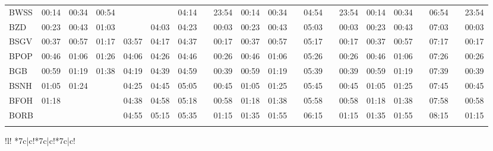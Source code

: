 \begin{center}
\ifpa
\ifpaula
\begin{tabular}{!{\color{magenta}\vrule width 3pt}l!{\color{magenta}\vrule width 3pt}*{7}{c|}c!{\color{magenta}\vrule width 3pt}*{2}{*{5}{c|}c!{\color{magenta}\vrule width 3pt}}}
\hline
{}
 &  &  \\
\hline
BWSS     & 
00:14 & 00:34 & 00:54 &       &       & 04:14 &  & 23:54 & 
00:14 & 00:34 &  & 04:54 &  & 23:54 & 
00:14 & 00:34 &  & 06:54 &  & 23:54 \\
BZD      & 
00:23 & 00:43 & 01:03 &       & 04:03 & 04:23 & \mgt{}   & 00:03 & 
00:23 & 00:43 & \mgt{}   & 05:03 & \mgt{}   & 00:03 &
00:23 & 00:43 & \mgt{}   & 07:03 & \mgt{}   & 00:03 \\
BSGV     & 
00:37 & 00:57 & 01:17 & 03:57 & 04:17 & 04:37 & \mgt{}   & 00:17 & 
00:37 & 00:57 & \mgt{}   & 05:17 & \mgt{}   & 00:17 &
00:37 & 00:57 & \mgt{}   & 07:17 & \mgt{}   & 00:17 \\
BPOP     & 
00:46 & 01:06 & 01:26 & 04:06 & 04:26 & 04:46 & \mgt{}   & 00:26 & 
00:46 & 01:06 & \mgt{}   & 05:26 & \mgt{}   & 00:26 &
00:46 & 01:06 & \mgt{}   & 07:26 & \mgt{}   & 00:26 \\
BGB      & 
00:59 & 01:19 & 01:38 & 04:19 & 04:39 & 04:59 & \mgt{}   & 00:39 & 
00:59 & 01:19 & \mgt{}   & 05:39 & \mgt{}   & 00:39 &
00:59 & 01:19 & \mgt{}   & 07:39 & \mgt{}   & 00:39 \\
BSNH     & 
01:05 & 01:24 &       & 04:25 & 04:45 & 05:05 & \mgt{}   & 00:45 & 
01:05 & 01:25 & \mgt{}   & 05:45 & \mgt{}   & 00:45 &
01:05 & 01:25 & \mgt{}   & 07:45 & \mgt{}   & 00:45 \\
BFOH     & 
01:18 &       &       & 04:38 & 04:58 & 05:18 & \mgt{}   & 00:58 & 
01:18 & 01:38 & \mgt{}   & 05:58 & \mgt{}   & 00:58 &
01:18 & 01:38 & \mgt{}   & 07:58 & \mgt{}   & 00:58 \\
BORB     & 
      &       &       & 04:55 & 05:15 & 05:35 & \mgt{}   & 01:15 & 
01:35 & 01:55 & \mgt{}   & 06:15 & \mgt{}   & 01:15 &
01:35 & 01:55 & \mgt{}   & 08:15 & \mgt{}   & 01:15 \\
\myhline
\end{tabular}
\begin{tabular}{!{\color{magenta}\vrule width 3pt}l!{\color{magenta}\vrule width 3pt}%
*{7}{c|}c!{\color{magenta}\vrule width 3pt}*{7}{c|}c!{\color{magenta}\vrule width 3pt}*{7}{c|}c!{\color{magenta}\vrule width 3pt}}

\end{tabular}
\end{center}
